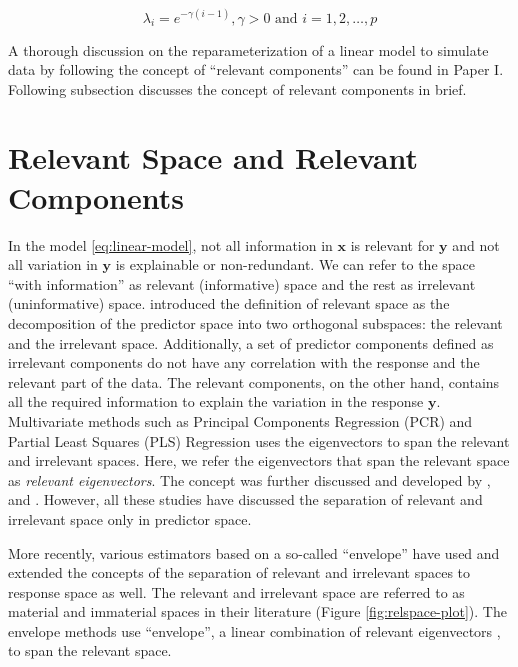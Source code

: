 \documentclass[11pt,twoside,openright,titlepage,
  headinclude,footinclude,BCOR=5mm,
  numbers=noenddot,cleardoublepage=empty,
  tablecaptionabove, dottedtoc,
  bibliography=totoc,paper=a4]{scrreprt}
\begin{document}
\begin{equation}
\lambda_i = e^{-\gamma(i - 1)}, \gamma >0 \text{ and } i = 1, 2, \ldots, p
\label{eq:exp-decay}
\end{equation}

A thorough discussion on the reparameterization of a linear model to simulate data by following the concept of ``relevant components'' can be found in Paper I. Following subsection discusses the concept of relevant components in brief.

\hypertarget{relevant-space-and-relevant-components}{%
\section{Relevant Space and Relevant Components}\label{relevant-space-and-relevant-components}}

In the model \eqref{eq:linear-model}, not all information in \(\mathbf{x}\) is relevant for \(\mathbf{y}\) and not all variation in \(\mathbf{y}\) is explainable or non-redundant. We can refer to the space ``with information'' as relevant (informative) space and the rest as irrelevant (uninformative) space. \citet{Naes1985} introduced the definition of relevant space as the decomposition of the predictor space into two orthogonal subspaces: the relevant and the irrelevant space. Additionally, a set of predictor components defined as irrelevant components do not have any correlation with the response and the relevant part of the data. The relevant components, on the other hand, contains all the required information to explain the variation in the response \(\mathbf{y}\). Multivariate methods such as Principal Components Regression (PCR) and Partial Least Squares (PLS) Regression uses the eigenvectors to span the relevant and irrelevant spaces. Here, we refer the eigenvectors that span the relevant space as \emph{relevant eigenvectors}. The concept was further discussed and developed by \citet{helland1990partial}, \citet{naes1993relevant} and \citet{Helland1994b}. However, all these studies have discussed the separation of relevant and irrelevant space only in predictor space.

More recently, various estimators \citep{cook2010envelope, cook2013envelopes, cook2015simultaneous} based on a so-called ``envelope'' \citep{Cook2007a} have used and extended the concepts of the separation of relevant and irrelevant spaces to response space as well. The relevant and irrelevant space are referred to as material and immaterial spaces in their literature (Figure \ref{fig:relspace-plot}). The envelope methods use ``envelope'', a linear combination of relevant eigenvectors \citep{cook2018envelope}, to span the relevant space.
\end{document}
